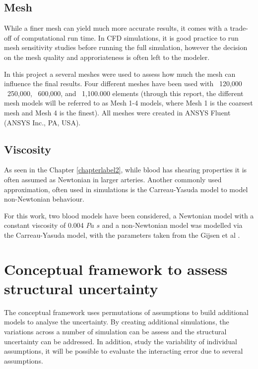 \subsection{Mesh}
While a finer mesh can yield much more accurate results, it comes with a trade-off of computational run time. In CFD simulations, it is  good practice to run mesh sensitivity studies before running the full simulation, however the decision on the mesh quality and approriateness is often left to the modeler.\par

In this project a several meshes were used to  assess how much the mesh can influence the final results. Four different meshes have been used with ~120,000 ~250,000, ~600,000, and ~1,100.000 elements (through this report, the different mesh models will be referred to as Mesh 1-4 models, where Mesh 1 is the coarsest mesh and Mesh 4 is the finest). All meshes were created in ANSYS Fluent (ANSYS Inc., PA, USA). \par

\subsection{Viscosity}
As seen in the Chapter \ref{chapterlabel2}, while blood has shearing properties it is often assumed as Newtonian in larger arteries. Another commonly used approximation, often used in simulations is the Carreau-Yasuda model to model non-Newtonian behaviour. \par

For this work, two blood models have been considered, a Newtonian model with a constant viscosity of 0.004 $Pa$ $s$ and a non-Newtonian model was modelled via the Carreau-Yasuda model, with the parameters taken from the Gijsen et al \cite{Gijsen1999TheModel}.

\section{Conceptual framework to assess structural uncertainty}
The conceptual framework uses permutations of assumptions to build additional models to analyse the uncertainty. By creating additional simulations, the variations across a number of simulation can be assess and the structural uncertainty can be addressed. In addition, study the variability of individual assumptions, it will be possible to evaluate the interacting error due to several assumptions.  \par

